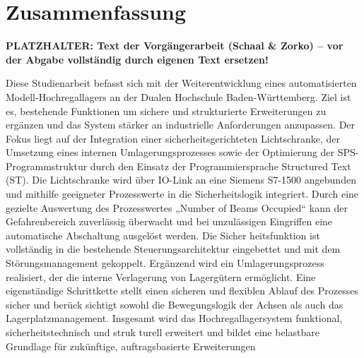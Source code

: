 \section*{Zusammenfassung} 

\noindent\colorbox{red!15}{\parbox{\dimexpr\textwidth-2\fboxsep}{\textbf{\color{red}PLATZHALTER: Text der Vorgängerarbeit (Schaal \& Zorko) – vor der Abgabe vollständig durch eigenen Text ersetzen!}}}

Diese Studienarbeit befasst sich mit der Weiterentwicklung eines automatisierten
Modell-Hochregallagers an der Dualen Hochschule Baden-Württemberg. Ziel ist es,
bestehende Funktionen um sichere und strukturierte Erweiterungen zu ergänzen und
das System stärker an industrielle Anforderungen anzupassen. Der Fokus liegt auf der
Integration einer sicherheitsgerichteten Lichtschranke, der Umsetzung eines internen
Umlagerungsprozesses sowie der Optimierung der SPS-Programmstruktur durch den
Einsatz der Programmiersprache Structured Text (ST). Die Lichtschranke wird über
IO-Link an eine Siemens S7-1500 angebunden und mithilfe geeigneter Prozesswerte
in die Sicherheitslogik integriert. Durch eine gezielte Auswertung des Prozesswertes
„Number of Beams Occupied“ kann der Gefahrenbereich zuverlässig überwacht und bei
unzulässigen Eingriffen eine automatische Abschaltung ausgelöst werden. Die Sicher
heitsfunktion ist vollständig in die bestehende Steuerungsarchitektur eingebettet und
mit dem Störungsmanagement gekoppelt. Ergänzend wird ein Umlagerungsprozess
realisiert, der die interne Verlagerung von Lagergütern ermöglicht. Eine eigenständige
Schrittkette stellt einen sicheren und flexiblen Ablauf des Prozesses sicher und berück
sichtigt sowohl die Bewegungslogik der Achsen als auch das Lagerplatzmanagement.
Insgesamt wird das Hochregallagersystem funktional, sicherheitstechnisch und struk
turell erweitert und bildet eine belastbare Grundlage für zukünftige, auftragsbasierte
Erweiterungen